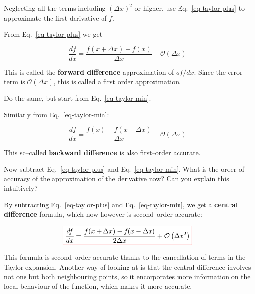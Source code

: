 \begin{cue}
Neglecting all the terms including $\left(\Delta x\right)^2$ or higher, use Eq.~\ref{eq-taylor-plus} to approximate the first derivative of $f$.
\end{cue}

From Eq.~\ref{eq-taylor-plus} we get

\begin{equation}
\frac{d f}{d x} = \frac{f(x+\Delta x) - f(x)}{\Delta x} + \mathcal{O}\left(\Delta x\right)
\end{equation} 

This is called the \textbf{forward difference} approximation of $df / dx$. Since the error term is $\mathcal{O}(\Delta x)$, this is called a first order approximation.

\begin{cue}
Do the same, but start from Eq.~\ref{eq-taylor-min}.
\end{cue}

Similarly from Eq.~\ref{eq-taylor-min}:

\begin{equation}
\frac{d f}{d x} = \frac{f(x) - f(x- \Delta x)}{\Delta x} + \mathcal{O}\left(\Delta x\right)
\end{equation} 

This so--called \textbf{backward difference} is also first--order accurate.

\begin{cue}
Now subtract Eq.~\ref{eq-taylor-plus} and Eq.~\ref{eq-taylor-min}. What is the order of accuracy of the approximation of the derivative now? Can you explain this intuitively?
\end{cue}

By subtracting Eq.~\ref{eq-taylor-plus} and Eq.~\ref{eq-taylor-min}, we get a \textbf{central difference} formula, which now however is second--order accurate:

\begin{equation}
\fbox{$\displaystyle
\frac{d f}{d x} = \frac{f(x + \Delta x) - f(x- \Delta x)}{2 \Delta x} + \mathcal{O}\left(\Delta x^2\right)
$}
\end{equation} 

This formula is second--order accurate thanks to the cancellation of terms in the Taylor expansion. Another way of looking at is that the central difference involves not one but both neighbouring points, so it encorporates more information on the local behaviour of the function, which makes it more accurate.

